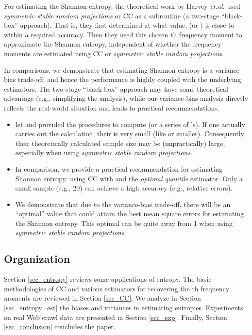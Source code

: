 \documentclass{sig-alternate}
\begin{document}
For estimating the Shannon entropy, the theoretical work by Harvey {\em et.al.}\cite{Article:Harvey_entropy_arXiv08,Proc:Harvey_FOCS08} used {\em symmetric stable random projections} or CC as a subroutine (a two-stage ``black-box'' approach). That is, they first determined at what  value,  (or ) is close to  within a required accuracy. Then they used this chosen th frequency moment to approximate the Shannon entropy, independent of whether the frequency moments are estimated using CC or {\em symmetric stable random projections}.

In comparisons, we demonstrate that  estimating Shannon entropy is  a variance-bias trade-off; and hence the performance is highly coupled with the underlying estimators. The two-stage ``black-box'' approach   \cite{Article:Harvey_entropy_arXiv08,Proc:Harvey_FOCS08} may have  some theoretical advantage (e.g., simplifying the analysis), while our variance-bias analysis directly reflects the real-world situation and leads to practical recommendations.
\begin{itemize}
\item  \cite{Article:Harvey_entropy_arXiv08,Proc:Harvey_FOCS08} let  and provided the procedures to compute  (or a series of 's). If one actually carries out the calculation, their  is very small (like  or smaller). Consequently their theoretically calculated sample size may be (impractically) large, especially when using {\em symmetric stable random projections}.
\item In comparison, we  provide a practical recommendation for estimating Shannon entropy: using CC with  and the {\em optimal quantile} estimator. Only a  small sample (e.g., 20) can achieve a high accuracy (e.g.,  relative errors).
\item We  demonstrate that due to the variance-bias trade-off, there will be an ``optimal''  value that could attain the best mean square errors for estimating the Shannon entropy. This optimal   can be quite away from 1  when using {\em symmetric stable random projections}.
\end{itemize}

\subsection{Organization}

Section \ref{sec_entropy} reviews  some applications of entropy. The basic methodologies of CC and various estimators for recovering the th frequency moments are reviewed in Section \ref{sec_CC}. We analyze in Section \ref{sec_entropy_est} the biases and variances in estimating entropies.  Experiments on real Web crawl data are presented in Section \ref{sec_exp}. Finally, Section \ref{sec_conclusion} concludes the paper.
\end{document}
